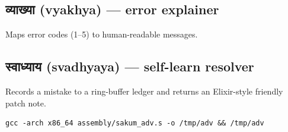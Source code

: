 \subsection{व्याख्या (vyakhya) --- error explainer}

Maps error codes (1--5) to human-readable messages.

\subsection{स्वाध्याय (svadhyaya) --- self-learn resolver}

Records a mistake to a ring-buffer ledger and returns an Elixir-style
friendly patch note.

\begin{verbatim}
gcc -arch x86_64 assembly/sakum_adv.s -o /tmp/adv && /tmp/adv
\end{verbatim}
